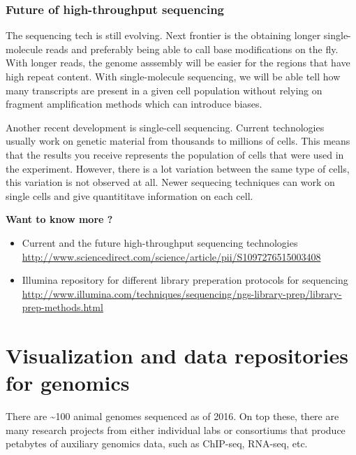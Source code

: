 \documentclass[12pt,]{krantz}
\theoremstyle{definition}
\theoremstyle{definition}
\theoremstyle{definition}
\theoremstyle{remark}
\let\BeginKnitrBlock\begin \let\EndKnitrBlock\end
\begin{document}
\hypertarget{future-of-high-throughput-sequencing}{%
\subsubsection{Future of high-throughput
sequencing}\label{future-of-high-throughput-sequencing}}

The sequencing tech is still evolving. Next frontier is the obtaining
longer single-molecule reads and preferably being able to call base
modifications on the fly. With longer reads, the genome asssembly will
be easier for the regions that have high repeat content. With
single-molecule sequencing, we will be able tell how many transcripts
are present in a given cell population without relying on fragment
amplification methods which can introduce biases.

Another recent development is single-cell sequencing. Current
technologies usually work on genetic material from thousands to millions
of cells. This means that the results you receive represents the
population of cells that were used in the experiment. However, there is
a lot variation between the same type of cells, this variation is not
observed at all. Newer sequecing techniques can work on single cells and
give quantititave information on each cell.

\BeginKnitrBlock{rmdtip}
\textbf{Want to know more ?}

\begin{itemize}
\item
  Current and the future high-throughput sequencing technologies
  \url{http://www.sciencedirect.com/science/article/pii/S1097276515003408}
\item
  Illumina repository for different library preperation protocols for
  sequencing
  \url{http://www.illumina.com/techniques/sequencing/ngs-library-prep/library-prep-methods.html}
\end{itemize}
\EndKnitrBlock{rmdtip}

\hypertarget{visualization-and-data-repositories-for-genomics}{%
\section{Visualization and data repositories for
genomics}\label{visualization-and-data-repositories-for-genomics}}

There are \textasciitilde{}100 animal genomes sequenced as of 2016. On
top these, there are many research projects from either individual labs
or consortiums that produce petabytes of auxiliary genomics data, such
as ChIP-seq, RNA-seq, etc.
\end{document}
